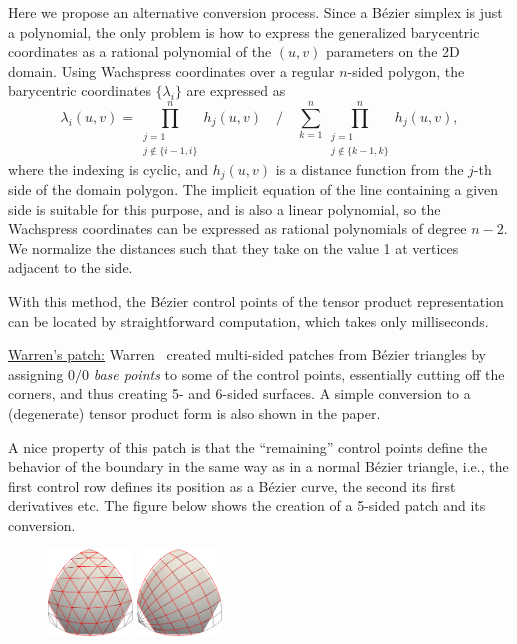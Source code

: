 \documentclass{article}
\begin{document}
Here we propose an alternative conversion process. Since a B\'ezier simplex is just a polynomial,
the only problem is how to express the generalized barycentric coordinates as a rational polynomial
of the $(u,v)$ parameters on the 2D domain. Using Wachspress coordinates over a regular $n$-sided
polygon, the barycentric coordinates $\{\lambda_i\}$ are expressed as
\begin{equation}
  \label{eq:wachspress}
  \lambda_i(u,v) = \prod_{\substack{j=1\\j\notin\{i-1,i\}}}^nh_j(u,v) \quad\bigg/\quad
                   \sum_{k=1}^n\prod_{\substack{j=1\\j\notin\{k-1,k\}}}^nh_j(u,v),
\end{equation}
where the indexing is cyclic, and $h_j(u,v)$ is a distance function
from the $j$-th side of the domain polygon. The implicit
equation of the line containing a given side is suitable for this purpose,
and is also a linear polynomial,
so the Wachspress coordinates can be expressed as rational polynomials of degree $n-2$. We
normalize the distances such that they take on the value 1 at vertices adjacent to the side.

With this method, the B\'ezier control points of the tensor product representation
can be located by straightforward computation, which takes only milliseconds.

\vspace{10pt}
\noindent\underline{Warren's patch:}\vspace{0.2em}\newline
Warren~\cite{warren} created multi-sided patches from B\'ezier triangles by assigning $0/0$
\emph{base points} to some of the control points, essentially cutting off the corners, and thus
creating 5- and 6-sided surfaces. A simple conversion to a (degenerate) tensor product form is
also shown in the paper.

A nice property of this patch is that the ``remaining'' control points define the behavior of the
boundary in the same way as in a normal B\'ezier triangle, i.e., the first control row defines
its position as a B\'ezier curve, the second its first derivatives etc.
The figure below shows the creation of a 5-sided patch and its conversion.
\begin{figure}[h!]
  \centering
  \includegraphics[width = 0.20\textwidth]{images/warren-cnet.png}
  \hspace{3cm}
  \includegraphics[width = 0.20\textwidth]{images/warren-quad.png}
\end{figure}
\end{document}
